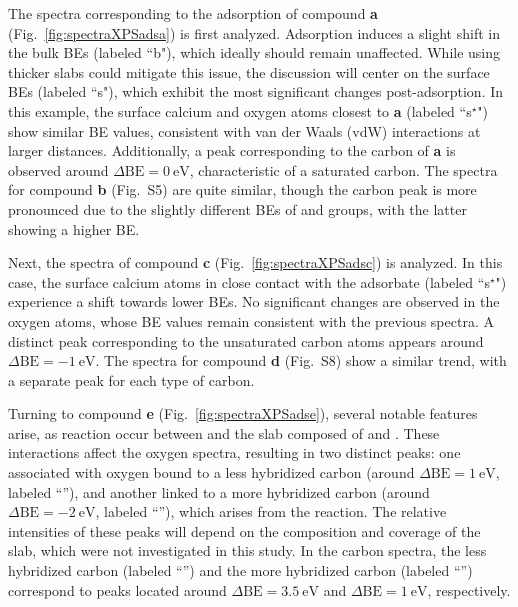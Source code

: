 \documentclass[journal=jpccck,manuscript=article]{achemso}
\def\dbe{\ensuremath{\Delta\text{BE}}}
\begin{document}
The spectra corresponding to the adsorption of compound \textbf{a} (Fig.~\ref{fig:spectraXPSadsa}) is first analyzed. Adsorption induces a slight shift in the bulk BEs (labeled ``b"), which ideally should remain unaffected. While using thicker slabs could mitigate this issue, the discussion will center on the surface BEs (labeled ``s"), which exhibit the most significant changes post-adsorption. In this example, the surface calcium and oxygen atoms closest to \textbf{a} (labeled ``s$^\star$") show similar BE values, consistent with van der Waals (vdW) interactions at larger distances. Additionally, a peak corresponding to the carbon of \textbf{a} is observed around $\dbe = \SI{0}{\electronvolt}$, characteristic of a saturated carbon. The spectra for compound \textbf{b} (Fig.~S5) are quite similar, though the carbon peak is more pronounced due to the slightly different BEs of  and  groups, with the latter showing a higher BE.


\clearpage

Next, the spectra of compound \textbf{c} (Fig.~\ref{fig:spectraXPSadsc}) is analyzed. In this case, the surface calcium atoms in close contact with the adsorbate (labeled ``s$^\star$") experience a shift towards lower BEs. No significant changes are observed in the oxygen atoms, whose BE values remain consistent with the previous spectra. A distinct peak corresponding to the unsaturated carbon atoms appears around $\dbe = \SI{-1}{\electronvolt}$. The spectra for compound \textbf{d} (Fig.~S8) show a similar trend, with a separate peak for each type of carbon.


Turning to compound \textbf{e} (Fig.~\ref{fig:spectraXPSadse}), several notable features arise, as reaction occur between  and the slab composed of  and . These interactions affect the oxygen spectra, resulting in two distinct peaks: one associated with oxygen bound to a less hybridized carbon (around $\dbe = \SI{1}{\electronvolt}$, labeled ``''), and another linked to a more hybridized carbon (around $\dbe = \SI{-2}{\electronvolt}$, labeled ``''), which arises from the reaction. The relative intensities of these peaks will depend on the composition and coverage of the slab, which were not investigated in this study. In the carbon spectra, the less hybridized carbon (labeled ``'') and the more hybridized carbon (labeled ``'') correspond to peaks located around $\dbe = \SI{3.5}{\electronvolt}$ and $\dbe = \SI{1}{\electronvolt}$, respectively. 
\end{document}
